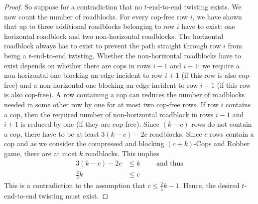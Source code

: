 \documentclass[a4paper,english, thm-restate]{lipics-v2021}
\begin{document}
\begin{proof}
So suppose for a contradiction that no $t$-end-to-end twisting exists. We now count the number of roadblocks.
For every cop-free row $i$, we have shown that up to three additional roadblocks belonging to row $i$ have to exist:
	one horizontal roadblock and two non-horizontal roadblocks. The horizontal roadblock always has to exist to prevent the path straight through row $i$ from being a $t$-end-to-end twisting. Whether the non-horizontal roadblocks have to exist depends on whether there are cops in rows $i-1$ and $i+1$: we require
	a non-horizontal one blocking an edge incident to row $i+1$ (if this row is also cop-free)
	and a non-horizontal one blocking an edge incident to row $i-1$ (if this row is also cop-free).
	A row containing a cop can reduces the number of roadblocks needed in some other row by one for at most two cop-free rows. If row $i$ contains a cop,
	then the required number of non-horizontal roadblock in rows $i-1$ and $i+1$ is reduced by one
	(if they are cop-free).
	Since $(k-c)$ rows do not contain a cop, there have to be at least
	$3(k-c) - 2c$ roadblocks.
	Since $c$ rows contain a cop and as we consider the compressed and blocking $(c+k)$-Cops and Robber game,
	there are at most $k$ roadblocks.
	This implies 
	\begin{align*}
		3(k-c)-2c &\leq k  \qquad\text { and thus} \\
		\frac{2}{5}k &\leq c 
	\end{align*}
	This is a contradiction to the assumption that
	$c \leq \frac{2}{5}k - 1$.
	Hence, the desired $t$-end-to-end twisting must exist.
\end{proof}
 
\end{document}
